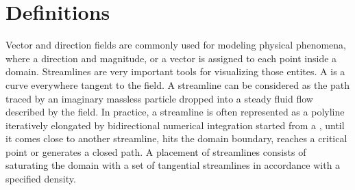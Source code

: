 \section{Definitions}
\label{Section_2D_Streamlines_Definitions}
Vector and direction fields are commonly used for modeling physical
phenomena, where a direction and magnitude, or a vector is assigned to
each point inside a domain. Streamlines are very important tools for
visualizing those entites. A  is a curve
everywhere tangent to the field.  A streamline can be considered as
the path traced by an imaginary massless particle dropped into a
steady fluid flow described by the field. In practice, a streamline is
often represented as a polyline iteratively elongated by bidirectional
numerical integration started from a , until it comes
close to another streamline, hits the domain boundary, reaches a
critical point or generates a closed path. A  placement of
streamlines consists of saturating the domain with a set of tangential
streamlines in accordance with a specified density.

